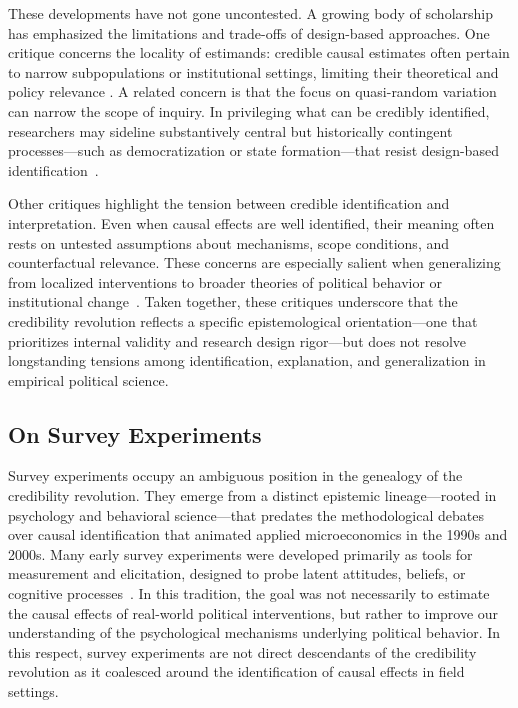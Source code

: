\documentclass[12pt]{article}
\begin{document}
These developments have not gone uncontested. A growing body of scholarship has emphasized the limitations and trade-offs of design-based approaches. One critique concerns the locality of estimands: credible causal estimates often pertain to narrow subpopulations or institutional settings, limiting their theoretical and policy relevance \citep[e.g.,][]{heckman1995randomization}. A related concern is that the focus on quasi-random variation can narrow the scope of inquiry. In privileging what can be credibly identified, researchers may sideline substantively central but historically contingent processes---such as democratization or state formation---that resist design-based identification~\citep{mahoney2006tale}.

Other critiques highlight the tension between credible identification and interpretation. Even when causal effects are well identified, their meaning often rests on untested assumptions about mechanisms, scope conditions, and counterfactual relevance. These concerns are especially salient when generalizing from localized interventions to broader theories of political behavior or institutional change~\citep{findley2021external}. %
Taken together, these critiques underscore that the credibility revolution reflects a specific epistemological orientation—one that prioritizes internal validity and research design rigor—but does not resolve longstanding tensions among identification, explanation, and generalization in empirical political science.

\subsection*{On Survey Experiments}\label{sec:surveys}

Survey experiments occupy an ambiguous position in the genealogy of the credibility revolution. They emerge from a distinct epistemic lineage---rooted in psychology and behavioral science---that predates the methodological debates over causal identification that animated applied microeconomics in the 1990s and 2000s. Many early survey experiments were developed primarily as tools for measurement and elicitation, designed to probe latent attitudes, beliefs, or cognitive processes~\citep{mutz2011population}. In this tradition, the goal was not necessarily to estimate the causal effects of real-world political interventions, but rather to improve our understanding of the psychological mechanisms underlying political behavior. In this respect, survey experiments are not direct descendants of the credibility revolution as it coalesced around the identification of causal effects in field settings.
\end{document}
